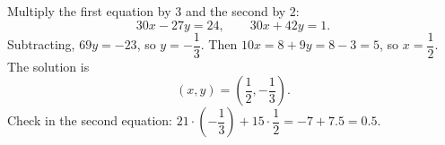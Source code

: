 Multiply the first equation by $3$ and the second by $2$:
\[
30x-27y=24,\qquad 30x+42y=1 .
\]
Subtracting, $69y=-23$, so $y=-\dfrac{1}{3}$. Then $10x=8+9y=8-3=5$, so $x=\dfrac{1}{2}$. The solution is
\[
\boxed{(x,y)=\left(\dfrac{1}{2},-\dfrac{1}{3}\right)}.
\]
Check in the second equation: $21\cdot\left(-\dfrac{1}{3}\right)+15\cdot\dfrac{1}{2}=-7+7.5=0.5$.

